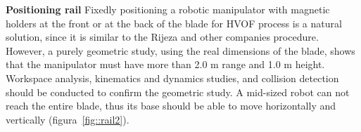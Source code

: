 

\textbf{Positioning rail}
Fixedly positioning a robotic manipulator with magnetic holders at the front or
at the back of the blade for HVOF process is a natural solution, since it is
similar to the Rijeza and other companies procedure. However, a purely geometric
study, using the real dimensions of the blade, shows that the manipulator must
have more than 2.0 m range and 1.0 m height. Workspace analysis, kinematics and
dynamics studies, and collision detection should be conducted to confirm the
geometric study. A mid-sized robot can not reach the entire blade, thus
its base should be able to move horizontally and vertically
(figura~\ref{fig::rail2}).

